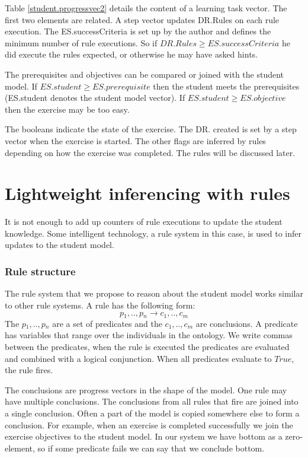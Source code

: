Table \ref{student.progressvec2} details the content of a learning task vector.
The first two elements are related. A step vector updates DR.Rules on each rule execution.
The ES.successCriteria is set up by the author and defines the minimum number of rule executions.
So if $\mathit{DR.Rules \geq ES.successCriteria }$ he did execute the rules expected, or otherwise he may have asked hints.

The prerequisites and objectives can be compared or joined with the student model.
If $\mathit{ES.student \geq ES.prerequisite}$ then the student meets the prerequisites (ES.student denotes the student model vector). 
If $\mathit{ES.student \geq ES.objective}$ then the exercise may be too easy.

The booleans indicate the state of the exercise. The DR. created is set by a step vector when the exercise is started.
The other flags are inferred by rules depending on how the exercise was completed. The rules will be discussed later.




\section{Lightweight inferencing with rules}
\label{sec:lwrules}
It is not enough to add up counters of rule executions to update the student knowledge.
Some intelligent technology, a rule system in this case, is used to infer updates to the student model.
\subsubsection{Rule structure}
\label{sec:rulestruc}

The rule system that we propose to reason about the student model works similar to other rule systems.
A rule has  the following form:
\begin{equation} \label{rl}
p{_1}, . . , p{_n} \rightarrow c{_1}, . . , c{_m}
\end{equation} 
The $p{_1}, . . , p{_n}$ are a set of predicates and the $c{_1}, . . , c{_m}$ are conclusions.
A predicate has variables that range over the individuals in the ontology.
We write commas between the predicates, when the rule is executed the predicates are evaluated and combined with a logical conjunction.
When all predicates evaluate to $\mathit{True}$, the rule fires. 

The conclusions are progress vectors in the shape of the model.
One rule may have multiple conclusions. The conclusions from all rules that fire are joined into a single conclusion.
Often a part of the model is copied somewhere else to form a conclusion.
For example, when an exercise is completed successfully we join the exercise objectives to the student model.
In our system we have bottom as a zero-element, so if some predicate fails we can say that we conclude bottom.


